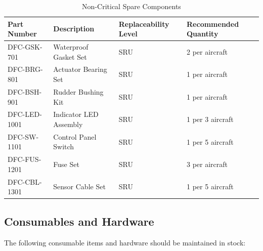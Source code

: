 \documentclass[12pt,a4paper,twoside,openright]{book}
\newcommand{\tabletextfont}{\normalfont\rmfamily}
\newcommand{\tableheadfont}{\normalfont\bfseries}
\begin{document}
\begin{table}[h]
\centering
\setlength{\tabcolsep}{5pt} %
\begin{tabular}{|p{}|p{}|p{}|p{}|}
\hline
\tableheadfont\textbf{Part Number} & \tableheadfont\textbf{Description} & \tableheadfont\textbf{Replaceability Level} & \tableheadfont\textbf{Recommended Quantity} \\
\hline
\tabletextfont DFC-GSK-701 & Waterproof Gasket Set & SRU & 2 per aircraft \\
\hline
\tabletextfont DFC-BRG-801 & Actuator Bearing Set & SRU & 1 per aircraft \\
\hline
\tabletextfont DFC-BSH-901 & Rudder Bushing Kit & SRU & 1 per aircraft \\
\hline
\tabletextfont DFC-LED-1001 & Indicator LED Assembly & SRU & 1 per 3 aircraft \\
\hline
\tabletextfont DFC-SW-1101 & Control Panel Switch & SRU & 1 per 5 aircraft \\
\hline
\tabletextfont DFC-FUS-1201 & Fuse Set & SRU & 3 per aircraft \\
\hline
\tabletextfont DFC-CBL-1301 & Sensor Cable Set & SRU & 1 per 5 aircraft \\
\hline
\end{tabular}
\caption{Non-Critical Spare Components}
\end{table}

\subsection{Consumables and Hardware}

The following consumable items and hardware should be maintained in stock:
\end{document}
